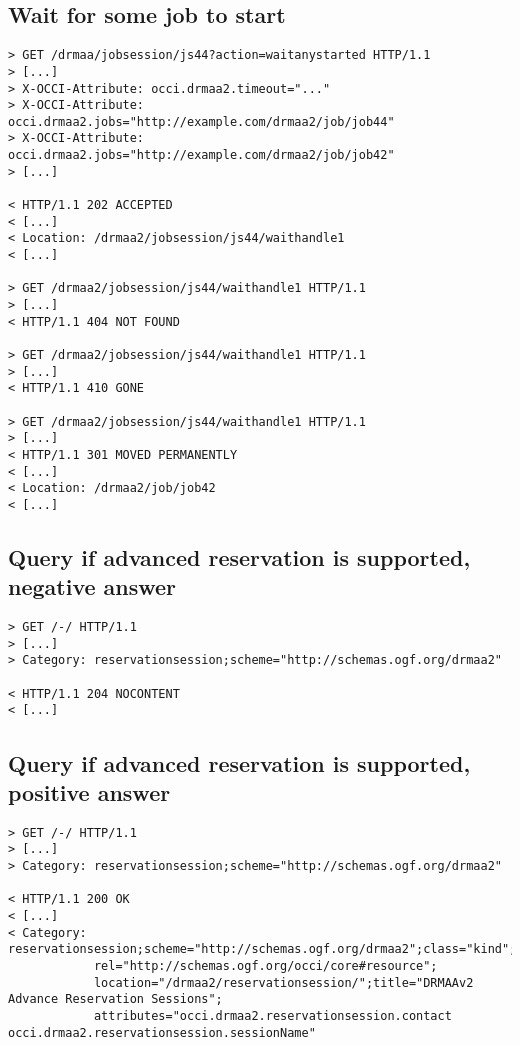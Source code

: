 \documentclass[10pt]{article}
\begin{document}

\subsection{Wait for some job to start}

\begin{verbatim}
> GET /drmaa/jobsession/js44?action=waitanystarted HTTP/1.1
> [...] 
> X-OCCI-Attribute: occi.drmaa2.timeout="..."
> X-OCCI-Attribute: occi.drmaa2.jobs="http://example.com/drmaa2/job/job44"
> X-OCCI-Attribute: occi.drmaa2.jobs="http://example.com/drmaa2/job/job42"
> [...] 

< HTTP/1.1 202 ACCEPTED
< [...] 
< Location: /drmaa2/jobsession/js44/waithandle1
< [...] 

> GET /drmaa2/jobsession/js44/waithandle1 HTTP/1.1
> [...] 
< HTTP/1.1 404 NOT FOUND

> GET /drmaa2/jobsession/js44/waithandle1 HTTP/1.1
> [...] 
< HTTP/1.1 410 GONE

> GET /drmaa2/jobsession/js44/waithandle1 HTTP/1.1
> [...] 
< HTTP/1.1 301 MOVED PERMANENTLY
< [...] 
< Location: /drmaa2/job/job42
< [...] 
\end{verbatim}


\subsection{Query if advanced reservation is supported, negative answer}

\begin{verbatim}
> GET /-/ HTTP/1.1
> [...]
> Category: reservationsession;scheme="http://schemas.ogf.org/drmaa2" 

< HTTP/1.1 204 NOCONTENT 
< [...]
\end{verbatim}


\subsection{Query if advanced reservation is supported, positive answer}

\begin{verbatim}
> GET /-/ HTTP/1.1
> [...]
> Category: reservationsession;scheme="http://schemas.ogf.org/drmaa2" 

< HTTP/1.1 200 OK 
< [...]
< Category: reservationsession;scheme="http://schemas.ogf.org/drmaa2";class="kind";
			rel="http://schemas.ogf.org/occi/core#resource";
            location="/drmaa2/reservationsession/";title="DRMAAv2 Advance Reservation Sessions";
            attributes="occi.drmaa2.reservationsession.contact occi.drmaa2.reservationsession.sessionName"
\end{verbatim}
\end{document}

